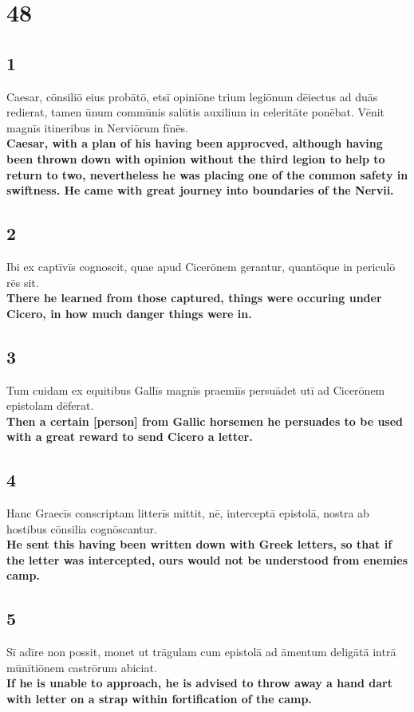 \documentclass{article}
\begin{document}
\section*{48}

\subsection*{1}
Caesar, cōnsiliō eius probātō, etsī opiniōne trium legiōnum dēiectus ad duās redierat, tamen ūnum commūnis salūtis auxilium in celeritāte ponēbat. Vēnit magnīs itineribus in Nerviōrum fīnēs. \\
\textbf{Caesar, with a plan of his having been approcved, although having been thrown down with opinion without the third legion to help to return to two, nevertheless he was placing one of the common safety in swiftness.  He came with great journey into boundaries of the Nervii.}

\subsection*{2}
Ibi ex captīvīs cognoscit, quae apud Cicerōnem gerantur, quantōque in periculō rēs sit. \\
\textbf{There he learned from those captured, things were occuring under Cicero, in how much danger things were in.}

\subsection*{3}
Tum cuidam ex equitibus Gallīs magnīs praemiīs persuādet utī ad Cicerōnem epistolam dēferat. \\
\textbf{Then a certain [person] from Gallic horsemen he persuades to be used with a great reward to send Cicero a letter. }

\subsection*{4}
Hanc Graecīs conscriptam litterīs mittit, nē, interceptā epistolā, nostra ab hostibus cōnsilia cognōscantur. \\
\textbf{He sent this having been written down with Greek letters, so that if the letter was intercepted, ours would not be understood from enemies camp. }

\subsection*{5}
Sī adīre non possit, monet ut trāgulam cum epistolā ad āmentum deligātā intrā mūnītiōnem castrōrum abiciat. \\
\textbf{If he is unable to approach, he is advised to throw away a hand dart with letter on a strap within fortification of the camp.}
\end{document}
